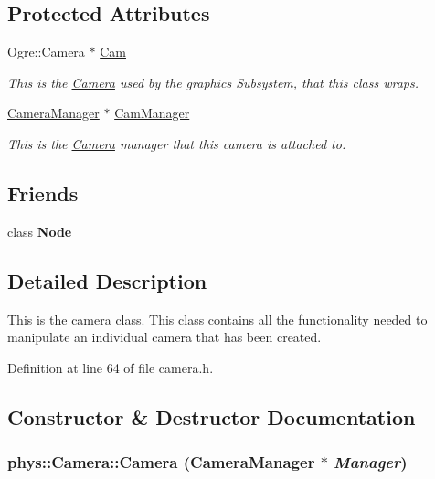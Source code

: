 \subsection*{Protected Attributes}
\begin{DoxyCompactItemize}
\item 
Ogre::Camera $\ast$ \hyperlink{classphys_1_1Camera_a91622148b9b9a9ae1554c828f7e2fc89}{Cam}
\begin{DoxyCompactList}\small\item\em This is the \hyperlink{classphys_1_1Camera}{Camera} used by the graphics Subsystem, that this class wraps. \item\end{DoxyCompactList}\item 
\hyperlink{classphys_1_1CameraManager}{CameraManager} $\ast$ \hyperlink{classphys_1_1Camera_a909203ede748deb1b587a8758ba8cec4}{CamManager}
\begin{DoxyCompactList}\small\item\em This is the \hyperlink{classphys_1_1Camera}{Camera} manager that this camera is attached to. \item\end{DoxyCompactList}\end{DoxyCompactItemize}
\subsection*{Friends}
\begin{DoxyCompactItemize}
\item 
\hypertarget{classphys_1_1Camera_a6db9d28bd448a131448276ee03de1e6d}{
class {\bfseries Node}}
\label{d9/df8/classphys_1_1Camera_a6db9d28bd448a131448276ee03de1e6d}

\end{DoxyCompactItemize}


\subsection{Detailed Description}
This is the camera class. This class contains all the functionality needed to manipulate an individual camera that has been created. 

Definition at line 64 of file camera.h.



\subsection{Constructor \& Destructor Documentation}
\hypertarget{classphys_1_1Camera_a1309e4191b22440035e360c205b81472}{
\subsubsection[{Camera}]{\setlength{\rightskip}{0pt plus 5cm}phys::Camera::Camera ({\bf CameraManager} $\ast$ {\em Manager})}}
\label{d9/df8/classphys_1_1Camera_a1309e4191b22440035e360c205b81472}


